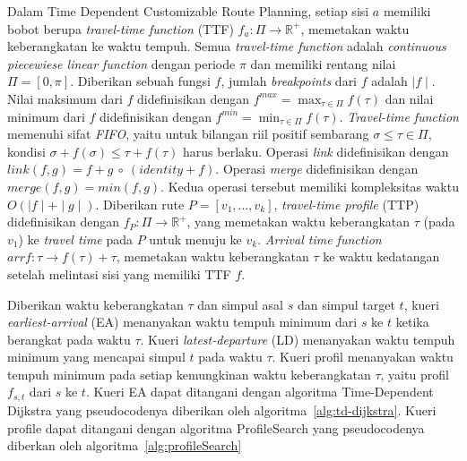 Dalam Time Dependent Customizable Route Planning, setiap sisi $a$ memiliki bobot berupa \textit{travel-time function} (TTF) $f_a:\Pi\rightarrow \mathbb{R}^{+}$, memetakan waktu keberangkatan ke waktu tempuh. Semua \textit{travel-time function} adalah \textit{continuous piecewiese linear function} dengan periode $\pi$ dan memiliki rentang nilai $\Pi=[0,\pi]$. Diberikan sebuah fungsi $f$, jumlah \textit{breakpoints} dari $f$ adalah $\mid f\mid $. Nilai maksimum dari $f$ didefinisikan dengan $f^{max}=\max_{\tau\in\Pi}f(\tau)$ dan nilai minimum dari $f$ didefinisikan dengan $f^{min}=\min_{\tau\in\Pi}f(\tau)$. \textit{Travel-time function} memenuhi sifat \textit{FIFO}, yaitu untuk bilangan riil positif sembarang $\sigma\leq\tau\in\Pi$, kondisi $\sigma+f(\sigma)\leq \tau+f(\tau)$ harus berlaku. Operasi \textit{link} didefinisikan dengan $link(f,g)=f+g \ \circ \ (identity+f)$. Operasi \textit{merge} didefinisikan dengan $merge(f,g)=min(f,g)$. Kedua operasi tersebut memiliki kompleksitas waktu $O(\mid f\mid +\mid g\mid )$. Diberikan rute $P=[v_1,\ldots,v_k]$, \textit{travel-time profile} (TTP) didefinisikan dengan $f_P:\Pi\rightarrow \mathbb{R}^{+}$, yang memetakan waktu keberangkatan $\tau$ (pada $v_1$) ke \textit{travel time} pada $P$ untuk menuju ke $v_k$. \textit{Arrival time function} $arr f:\tau\rightarrow f(\tau)+\tau$, memetakan waktu keberangkatan $\tau$ ke waktu kedatangan setelah melintasi sisi yang memiliki TTF $f$. 

Diberikan waktu keberangkatan $\tau$ dan simpul asal $s$ dan simpul target $t$, kueri \textit{earliest-arrival} (EA) menanyakan waktu tempuh minimum dari $s$ ke $t$ ketika berangkat pada waktu $\tau$. Kueri \textit{latest-departure} (LD) menanyakan waktu tempuh minimum yang mencapai simpul $t$ pada waktu $\tau$. Kueri profil menanyakan waktu tempuh minimum pada setiap kemungkinan waktu keberangkatan $\tau$, yaitu profil $f_{s,t}$ dari $s$ ke $t$. Kueri EA dapat ditangani dengan algoritma Time-Dependent Dijkstra yang pseudocodenya diberikan oleh algoritma~\ref{alg:td-dijkstra}. Kueri profile dapat ditangani dengan algoritma ProfileSearch yang pseudocodenya diberkan oleh algoritma~\ref{alg:profileSearch}

